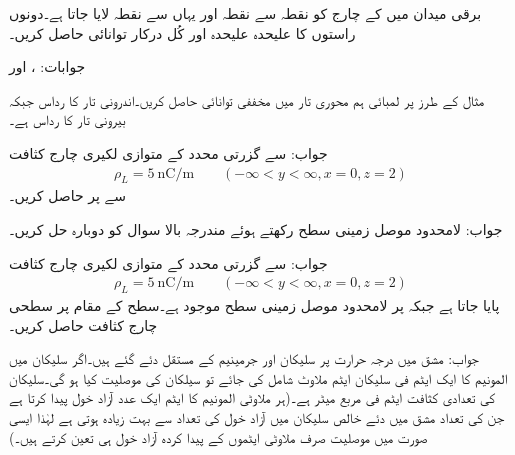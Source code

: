 

برقی میدان  میں  کے چارج کو نقطہ  سے نقطہ  اور  یہاں سے نقطہ  لایا جاتا ہے۔دونوں راستوں کا علیحدہ علیحدہ اور کُل درکار توانائی حاصل کریں۔

جوابات: ،  اور 

مثال  کے طرز پر  لمبائی ہم محوری تار میں مخففی توانائی حاصل کریں۔اندرونی تار کا رداس  جبکہ بیرونی تار کا رداس  ہے۔

جواب:
%
 سے گزرتی  محدد کے متوازی لکیری چارج کثافت
\begin{align*}
\rho_L=\SI{5}{\nano \coulomb \per \meter}  \quad \quad (-\infty < y < \infty, x=0,z=2)
\end{align*} 
سے  پر  حاصل کریں۔

جواب:
لامحدود موصل زمینی سطح   رکھتے ہوئے  مندرجہ بالا سوال کو دوبارہ حل کریں۔

جواب:
 سے گزرتی  محدد کے متوازی لکیری چارج کثافت
\begin{align*}
\rho_L=\SI{5}{\nano \coulomb \per \meter}  \quad \quad (-\infty < y < \infty, x=0,z=2)
\end{align*} 
پایا جاتا ہے جبکہ  پر لامحدود موصل زمینی سطح موجود ہے۔سطح کے  مقام پر سطحی چارج کثافت حاصل کریں۔

جواب: 
مشق  میں  درجہ حرارت پر  سلیکان اور جرمینیم کے مستقل دئے گئے ہیں۔اگر سلیکان میں المونیم کا ایک ایٹم فی   سلیکان ایٹم  ملاوٹ شامل کی جائے تو سیلکان کی موصلیت کیا ہو گی۔سلیکان کی تعدادی کثافت  ایٹم فی مربع میٹر ہے۔(ہر ملاوٹی المونیم کا  ایٹم ایک عدد آزاد خول پیدا کرتا ہے جن  کی تعداد مشق میں دئے خالص سلیکان میں آزاد خول کی تعداد سے بہت زیادہ ہوتی ہے لہٰذا ایسی صورت میں موصلیت صرف ملاوٹی ایٹموں کے پیدا کردہ آزاد خول ہی تعین کرتے ہیں۔) 

